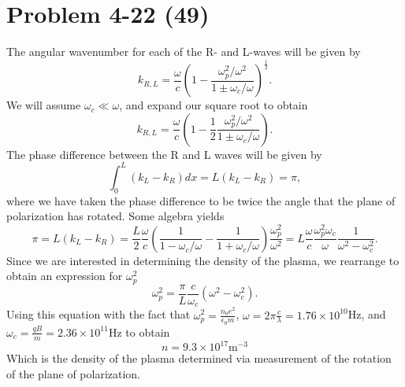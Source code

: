 \section*{Problem 4-22 (49)}
\label{sec:4-22}
The angular wavenumber for each of the R- and L-waves will be given by
\begin{equation*}
	k_{R,L} = \dfrac{\omega}{c} \left(1 - \dfrac{\omega_p^2/\omega^2}{1 \pm \omega_c/\omega} \right)^{\frac{1}{2}}.
\end{equation*}
We will assume \(\omega_c \ll \omega \), and expand our square root to obtain
\begin{equation*}
	k_{R,L} = \dfrac{\omega}{c} \left(1 - \dfrac{1}{2}\dfrac{\omega_p^2/\omega^2}{1 \pm \omega_c/\omega} \right).
\end{equation*}
The phase difference between the R and L waves will be given by
\begin{equation*}
	\int_0^L (k_L - k_R)dx = L(k_L-k_R) = \pi,
\end{equation*}
where we have taken the phase difference to be twice the angle that the plane of polarization has rotated. Some algebra yields
\begin{equation*}
	\pi = L(k_L-k_R) = \dfrac{L}{2}\dfrac{\omega}{c}\left(\dfrac{1}{1-\omega_c/\omega} - \dfrac{1}{1+\omega_c/\omega}\right)\dfrac{\omega^2_p}{\omega^2} = L\dfrac{\omega}{c} \dfrac{\omega^2_p\omega_c}{\omega}\dfrac{1}{\omega^2 - \omega_c^2}.
\end{equation*}
Since we are interested in determining the density of the plasma, we rearrange to obtain an expression for \(\omega^2_p \)
\begin{equation*}
	\omega^2_p = \dfrac{\pi}{L}\dfrac{c}{\omega_c}\left(\omega^2 - \omega^2_c \right).
\end{equation*}
Using this equation with the fact that \(\omega^2_p = \frac{n_0e^2}{\epsilon_0m} \), \(\omega = 2\pi\frac{c}{\lambda} = 1.76 \times 10^{10} \)Hz, and \(\omega_c = \frac{qB}{m} = 2.36\times10^{11} \)Hz to obtain
\begin{equation*}
	n = 9.3 \times 10^{17}\text{m}^{-3}
\end{equation*}
Which is the density of the plasma determined via measurement of the rotation of the plane of polarization. 

